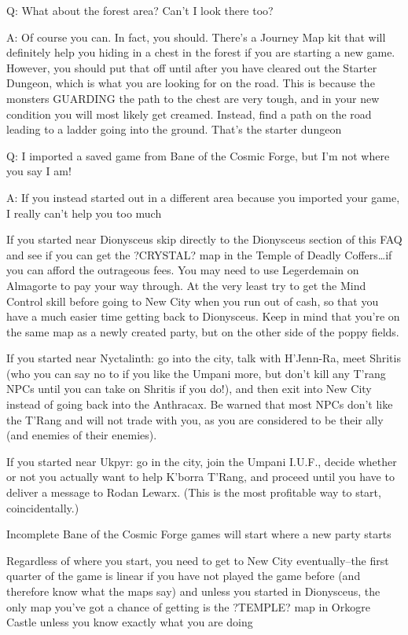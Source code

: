 \documentclass[12pt]{article}
\begin{document}
Q: What about the forest area? Can't I look there too?

A: Of course you can. In fact, you should. There's a Journey Map kit
that will definitely help you hiding in a chest in the forest if you are
starting a new game. However, you should put that off until after you
have cleared out the Starter Dungeon, which is what you are looking for
on the road. This is because the monsters GUARDING the path to the chest
are very tough, and in your new condition you will most likely get
creamed. Instead, find a path on the road leading to a ladder going into
the ground. That's the starter dungeon

Q: I imported a saved game from Bane of the Cosmic Forge, but I'm not
where you say I am!

A: If you instead started out in a different area because you imported
your game, I really can't help you too much

If you started near Dionysceus skip directly to the Dionysceus section
of this FAQ and see if you can get the ?CRYSTAL? map in the Temple of
Deadly Coffers\ldots{}if you can afford the outrageous fees. You may
need to use Legerdemain on Almagorte to pay your way through. At the
very least try to get the Mind Control skill before going to New City
when you run out of cash, so that you have a much easier time getting
back to Dionysceus. Keep in mind that you're on the same map as a newly
created party, but on the other side of the poppy fields.

If you started near Nyctalinth: go into the city, talk with H'Jenn-Ra,
meet Shritis (who you can say no to if you like the Umpani more, but
don't kill any T'rang NPCs until you can take on Shritis if you do!),
and then exit into New City instead of going back into the Anthracax. Be
warned that most NPCs don't like the T'Rang and will not trade with you,
as you are considered to be their ally (and enemies of their enemies).

If you started near Ukpyr: go in the city, join the Umpani I.U.F.,
decide whether or not you actually want to help K'borra T'Rang, and
proceed until you have to deliver a message to Rodan Lewarx. (This is
the most profitable way to start, coincidentally.)

Incomplete Bane of the Cosmic Forge games will start where a new party
starts

Regardless of where you start, you need to get to New City
eventually--the first quarter of the game is linear if you have not
played the game before (and therefore know what the maps say) and unless
you started in Dionysceus, the only map you've got a chance of getting
is the ?TEMPLE? map in Orkogre Castle unless you know exactly what you
are doing
\end{document}
